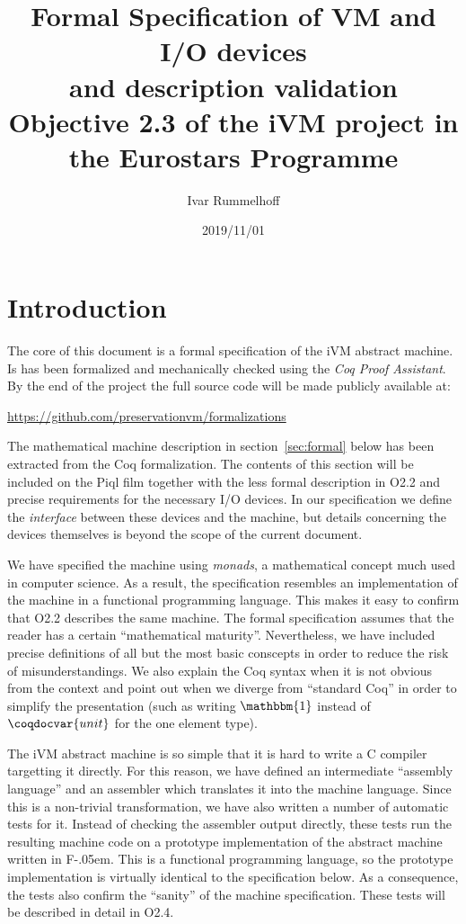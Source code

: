 \documentclass[10pt,a4paper]{article}
\title{%
  Formal Specification of VM and I/O devices\\
  and description validation\\[2ex]
  \large \textbf{Objective 2.3} of the iVM project in the Eurostars Programme
}
\author{Ivar Rummelhoff}
\date{2019/11/01}
\newcommand{\FSharp}{\textsf{F\nolinebreak[4]\kern-.05em\raisebox{.2ex}{\small\#}}\xspace}
\begin{document}
\maketitle

\section{Introduction}

The core of this document is a formal specification of the iVM abstract machine. Is has been formalized and mechanically checked using the \emph{Coq Proof Assistant}. By the end of the project the full source code will be made publicly available at:

\begin{center}
  \url{https://github.com/preservationvm/formalizations}
\end{center}

The mathematical machine description in section~\ref{sec:formal} below has been extracted from the Coq formalization. The contents of this section will be included on the Piql film together with the less formal description in O2.2 and precise requirements for the necessary I/O devices. In our specification we define the \emph{interface} between these devices and the machine, but details concerning the devices themselves is beyond the scope of the current document.

We have specified the machine using \emph{monads}, a mathematical concept much used in computer science. As a result, the specification resembles an implementation of the machine in a functional programming language. This makes it easy to confirm that O2.2 describes the same machine. The formal specification assumes that the reader has a certain ``mathematical maturity''. Nevertheless, we have included precise definitions of all but the most basic conscepts in order to reduce the risk of misunderstandings. We also explain the Coq syntax when it is not obvious from the context and point out when we diverge from ``standard Coq'' in order to simplify the presentation (such as writing $\mathbbm{1}$ instead of $\coqdocvar{unit}$ for the one element type).

The iVM abstract machine is so simple that it is hard to write a C compiler targetting it directly. For this reason, we have defined an intermediate ``assembly language'' and an assembler which translates it into the machine language. Since this is a non-trivial transformation, we have also written a number of automatic tests for it. Instead of checking the assembler output directly, these tests run the resulting machine code on a prototype implementation of the abstract machine written in \FSharp. This is a functional programming language, so the prototype implementation is virtually identical to the specification below. As a consequence, the tests also confirm the ``sanity'' of the machine specification. These tests will be described in detail in O2.4.
\end{document}
